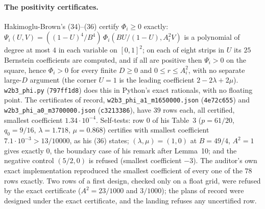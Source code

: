 \documentclass[11pt]{article}
\theoremstyle{definition}
\newcommand{\lean}[1]{\texttt{#1}}
\begin{document}
\paragraph{The positivity certificates.} Hakimoglu-Brown's (34)--(36) \cite[pp.~22--23]{HakimogluBrown2026} certify $\Phi_i \ge 0$ exactly: $\Psi_i(U, V) = ((1 - U)^4/B^4)\,\Phi_i(BU/(1-U), A_i^2V)$ is a polynomial of degree at most $4$ in each variable on $[0, 1]^2$; on each of eight strips in $U$ its $25$ Bernstein coefficients are computed, and if all are positive then $\Psi_i > 0$ on the square, hence $\Phi_i > 0$ for every finite $D \ge 0$ and $0 \le r \le A_i^2$, with no separate large-$D$ argument (the corner $U = 1$ is the leading coefficient $2 - 2\lambda + 2\mu$). \lean{w2b3\_phi.py} (\lean{797ff1d8}) does this in Python's exact rationals, with no floating point. The certificates of record, \lean{w2b3\_phi\_a1\_m1650000.json} (\lean{4e72c655}) and \lean{w2b3\_phi\_a0\_m3700000.json} (\lean{c3213386}), have $39$ rows each, all certified, smallest coefficient $1.34\cdot10^{-4}$. Self-tests: row $0$ of his Table~3 ($p = 61/20$, $q_0 = 9/16$, $\lambda = 1.718$, $\mu = 0.868$) certifies with smallest coefficient $7.1\cdot10^{-3} > 13/10000$, as his (36) states; $(\lambda, \mu) = (1, 0)$ at $B = 49/4$, $A^2 = 1$ gives exactly $0$, the boundary case of his remark after Lemma~10; and the negative control $(5/2, 0)$ is refused (smallest coefficient $-3$). The auditor's own exact implementation reproduced the smallest coefficient of every one of the $78$ rows exactly. Two rows of a first design, checked only on a float grid, were refused by the exact certificate ($A^2 = 23/1000$ and $3/1000$); the plans of record were designed under the exact certificate, and the landing refuses any uncertified row.
\end{document}

